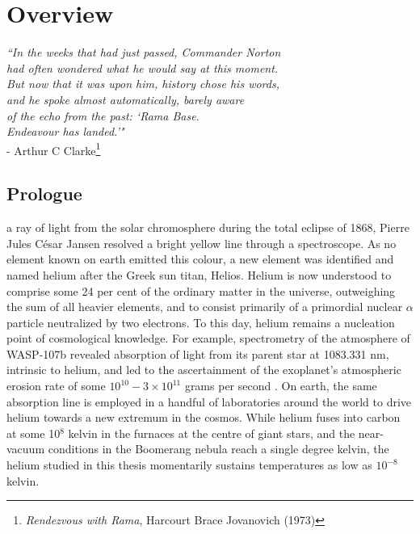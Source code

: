 

\chapter{Overview}

\begin{adjustwidth}{3cm}{0cm}
\begin{flushright}
\singlespacing
{\emph{``In the weeks that had just passed, Commander Norton\\
had often wondered what he would say at this moment.\\
But now that it was upon him, history chose his words,\\
and he spoke almost	automatically, 	barely aware \\
of the echo from the past: `Rama Base.\\
 \emph{Endeavour} has landed.'"}\\ 
- Arthur C Clarke\footnote{\emph{Rendezvous with Rama}, Harcourt Brace Jovanovich (1973)}}
\end{flushright}
\end{adjustwidth}
\onehalfspacing
\vspace{1cm}


\section*{Prologue}\label{sec:prologue}


	 a ray of light from the solar chromosphere during the total eclipse of 1868, Pierre Jules C\'{e}sar Jansen resolved a bright yellow line through a spectroscope.
	As no element known on earth emitted this colour, a new element was identified and named helium after the Greek sun titan, Helios. Helium is now understood to comprise some 24 per cent of the ordinary matter in the universe, outweighing the sum of all heavier elements, and to consist primarily of a primordial nuclear $\alpha$ particle neutralized by two electrons. To this day, helium remains a nucleation point of cosmological knowledge. For example, spectrometry of the atmosphere of WASP-107b revealed absorption of light from its parent star at 1083.331 nm, intrinsic to helium, and led to the ascertainment of the exoplanet's atmospheric erosion rate of some $10^{10}-3\times10^{11}$ grams per second \cite{Spake18}. On earth, the same absorption line is employed in a handful of laboratories around the world to drive helium towards a new extremum in the cosmos. While helium fuses into carbon at some 10$^8$ kelvin in the furnaces at the centre of giant stars, and the near-vacuum conditions in the Boomerang nebula reach a single degree kelvin, the helium studied in this thesis momentarily sustains temperatures as low as $10^{-8}$ kelvin.

